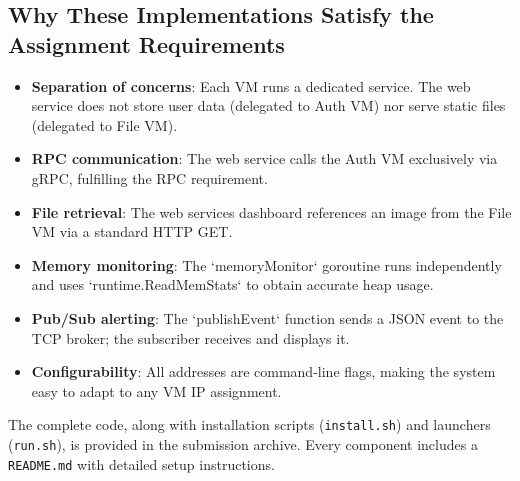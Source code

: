 \documentclass[a4paper]{article}
\begin{document}
\subsection{Why These Implementations Satisfy the Assignment Requirements}
\begin{itemize}
    \item \textbf{Separation of concerns}: Each VM runs a dedicated service. The web service does not store user data (delegated to Auth VM) nor serve static files (delegated to File VM).
    \item \textbf{RPC communication}: The web service calls the Auth VM exclusively via gRPC, fulfilling the RPC requirement.
    \item \textbf{File retrieval}: The web services dashboard references an image from the File VM via a standard HTTP GET.
    \item \textbf{Memory monitoring}: The `memoryMonitor` goroutine runs independently and uses `runtime.ReadMemStats` to obtain accurate heap usage.
    \item \textbf{Pub/Sub alerting}: The `publishEvent` function sends a JSON event to the TCP broker; the subscriber receives and displays it.
    \item \textbf{Configurability}: All addresses are command-line flags, making the system easy to adapt to any VM IP assignment.
\end{itemize}

The complete code, along with installation scripts (\texttt{install.sh}) and launchers (\texttt{run.sh}), is provided in the submission archive. Every component includes a \texttt{README.md} with detailed setup instructions.
\end{document}
